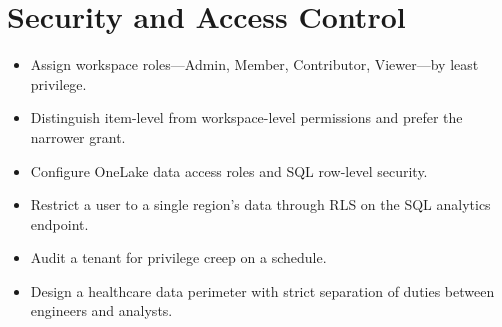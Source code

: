 \chapter{Security and Access Control}
%

\begin{objectives}
\begin{itemize}
    \item Assign workspace roles---Admin, Member, Contributor, Viewer---by least privilege.
    \item Distinguish item-level from workspace-level permissions and prefer the narrower grant.
    \item Configure OneLake data access roles and SQL row-level security.
    \item Restrict a user to a single region's data through RLS on the SQL analytics endpoint.
    \item Audit a tenant for privilege creep on a schedule.
    \item Design a healthcare data perimeter with strict separation of duties between engineers and analysts.
\end{itemize}
\end{objectives}

